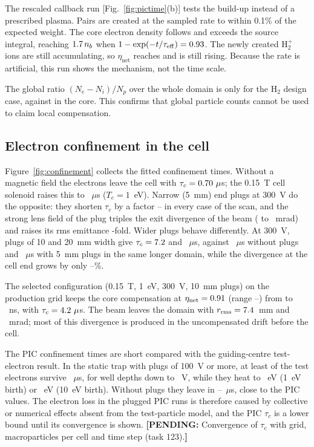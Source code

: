 \documentclass[aps,prab,10pt,twocolumn,superscriptaddress,showpacs,floatfix]{revtex4-2}
\newcommand{\pending}[1]{\textcolor{red!70!black}{\textbf{[PENDING:} #1\textbf{]}}}
\newcommand{\Htwo}{\mathrm{H}_2}
\begin{document}
The rescaled callback run [Fig.~\ref{fig:pictime}(b)] tests the build-up instead of a
prescribed plasma. Pairs are created at the sampled rate to within 0.1\% of the expected
weight. The core electron density follows and exceeds the source integral, reaching
$1.7\,n_b$ when $1-\exp(-t/\tau_{\mathrm{eff}})=0.93$. The newly created
$\Htwo^+$ ions are still accumulating, so $\eta_{\mathrm{net}}$ reaches \numpicacceta{} and is still
rising. Because the rate is artificial, this run shows the mechanism, not the time scale.

The global ratio $(N_e-N_i)/N_p$ over the whole domain is only \numpicHtwoglobal{} for the
$\Htwo$ design case, against \numpicHtwoeta{} in the core. This confirms that global particle
counts cannot be used to claim local compensation.

\subsection{Electron confinement in the cell}
\label{sec:confinement}

Figure~\ref{fig:confinement} collects the fitted confinement times. Without a magnetic field
the electrons leave the cell with $\tau_c=0.70~\mu$s; the 0.15~T cell solenoid
raises this to \numstCOtauBhigh~$\mu$s ($T_e=1$~eV). Narrow (5~mm) end plugs at 300~V do the
opposite: they shorten $\tau_c$ by a factor \numstCOplugratiomin--\numstCOplugratiomax{} in
every case of the scan, and the strong lens field of the plug triples the exit divergence of
the beam (\numstCthreedivnoplug{} to \numstCthreedivplug~mrad) and raises its rms emittance
\numstCthreeremit-fold. Wider plugs behave differently. At 300~V, plugs of 10 and 20~mm width
give $\tau_c=7.2$ and \numstCFtauwtwenty~$\mu$s, against \numstCFtaunoplug~$\mu$s
without plugs and \numstCFtauwfive~$\mu$s with 5~mm plugs in the same longer domain, while the
divergence at the cell end grows by only \numstCFdivincrmin--\numstCFdivincrmax\%.

The selected configuration (0.15~T, 1~eV, 300~V, 10~mm plugs) on the production grid keeps
the core compensation at $\eta_{\mathrm{net}}=0.91$ (range
\numstCWetamin--\numstCWetamax) from \numstCWfromns{} to \numstCWtendns~ns, with
$\tau_c=4.2~\mu$s. The beam leaves the domain with
$r_{\mathrm{rms}}=7.4$~mm and \numstCWdivexit~mrad; most of this divergence is
produced in the uncompensated drift before the cell.

The PIC confinement times are short compared with the guiding-centre test-electron result.
In the static trap with plugs of 100~V or more, at least \numstCtwosurvmin{} of the test
electrons survive \numstCtwotend~$\mu$s, for well depths down to \numstCtwowellmin~V, while
they heat to \numstCtwoenergylow~eV (1~eV birth) or \numstCtwoenergyhigh~eV (10~eV birth).
Without plugs they leave in \numstCtwoopentaumin--\numstCtwoopentaumax~$\mu$s, close to the
PIC values. The electron loss in the plugged PIC runs is therefore caused by collective or
numerical effects absent from the test-particle model, and the PIC $\tau_c$ is a lower bound
until its convergence is shown.
\pending{Convergence of $\tau_c$ with grid, macroparticles per cell and time step (task 123).}
\end{document}

